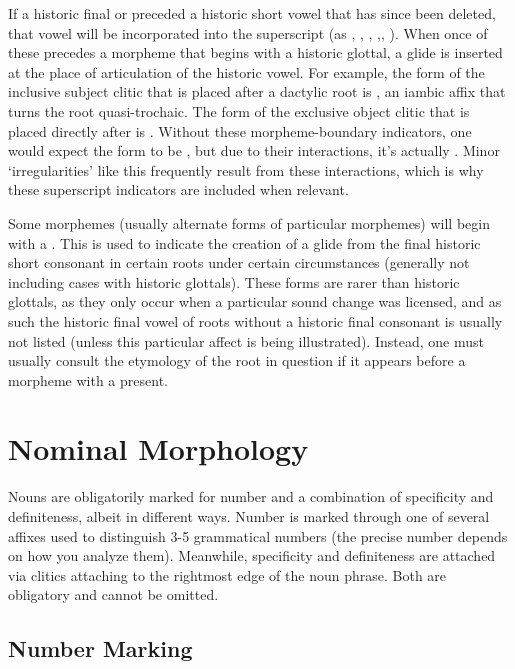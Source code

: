 \documentclass[a4paper,11pt,oneside,openany]{memoir}
\begin{document}
If a historic final  or \proto{\glotstop} preceded a historic short vowel that has since been deleted, that vowel will be incorporated into the superscript (as \supho{}, \supha{}, \suphi{}, \supgloto{},\supglota{}, \supgloti{}). When once of these precedes a morpheme that begins with a historic glottal, a glide is inserted at the place of articulation of the historic vowel. For example, the form of the inclusive subject clitic that is placed after a dactylic root is , an iambic affix that turns the root quasi-trochaic. The form of the exclusive object clitic that is placed directly after is . Without these morpheme-boundary indicators, one would expect the form to be , but due to their interactions, it's actually . Minor `irregularities' like this frequently result from these interactions, which is why these superscript indicators are included when relevant. 

Some morphemes (usually alternate forms of particular morphemes) will begin with a \supg{}. This is used to indicate the creation of a glide from the final historic short consonant in certain roots under certain circumstances (generally not including cases with historic glottals). These forms are rarer than historic glottals, as they only occur when a particular sound change was licensed, and as such the historic final vowel of roots without a historic final consonant is usually not listed (unless this particular affect is being illustrated). Instead, one must usually consult the etymology of the root in question if it appears before a morpheme with a \supg{} present.

\section{Nominal Morphology}

Nouns are obligatorily marked for number and a combination of specificity and definiteness, albeit in different ways. Number is marked through one of several affixes used to distinguish 3-5 grammatical numbers (the precise number depends on how you analyze them). Meanwhile, specificity and definiteness are attached via clitics attaching to the rightmost edge of the noun phrase. Both are obligatory and cannot be omitted.

\subsection{Number Marking}
\end{document}

